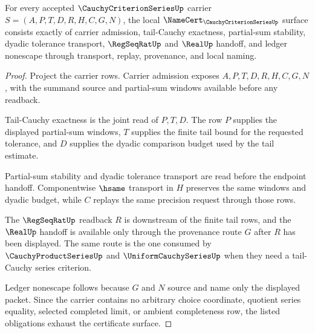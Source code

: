 \begin{theorem}
\label{thm:cauchy-criterion-series-obligations}
For every accepted $\CauchyCriterionSeriesUp$ carrier $S=(A,P,T,D,R,H,C,G,N)$, the local $\NameCert_{\CauchyCriterionSeriesUp}$ surface consists exactly of carrier admission, tail-Cauchy exactness, partial-sum stability, dyadic tolerance transport, $\RegSeqRatUp$ and $\RealUp$ handoff, and ledger nonescape through transport, replay, provenance, and local naming.
\end{theorem}
\begin{proof}
Project the carrier rows. Carrier admission exposes $A,P,T,D,R,H,C,G,N$, with the summand source and partial-sum windows available before any readback.

Tail-Cauchy exactness is the joint read of $P,T,D$. The row $P$ supplies the displayed partial-sum windows, $T$ supplies the finite tail bound for the requested tolerance, and $D$ supplies the dyadic comparison budget used by the tail estimate.

Partial-sum stability and dyadic tolerance transport are read before the endpoint handoff. Componentwise $\hsame$ transport in $H$ preserves the same windows and dyadic budget, while $C$ replays the same precision request through those rows.

The $\RegSeqRatUp$ readback $R$ is downstream of the finite tail rows, and the $\RealUp$ handoff is available only through the provenance route $G$ after $R$ has been displayed. The same route is the one consumed by $\CauchyProductSeriesUp$ and $\UniformCauchySeriesUp$ when they need a tail-Cauchy series criterion.

Ledger nonescape follows because $G$ and $N$ source and name only the displayed packet. Since the carrier contains no arbitrary choice coordinate, quotient series equality, selected completed limit, or ambient completeness row, the listed obligations exhaust the certificate surface.
\end{proof}

